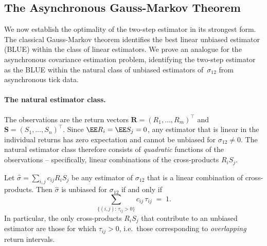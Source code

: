 %
%

\subsection{The Asynchronous Gauss-Markov Theorem}
\label{sec:gaussmarkov}

We now establish the optimality of the two-step estimator in its
strongest form.  The classical Gauss-Markov theorem identifies the
best linear unbiased estimator (BLUE) within the class of linear
estimators.  We prove an analogue for the asynchronous covariance
estimation problem, identifying the two-step estimator as the BLUE
within the natural class of unbiased estimators of~$\sigma_{12}$
from asynchronous tick data.

\paragraph{The natural estimator class.}
The observations are the return vectors
$\mathbf{R} = (R_1,\dots,R_m)^\top$ and
$\mathbf{S} = (S_1,\dots,S_n)^\top$.
Since $\EE R_i = \EE S_j = 0$, any estimator that is linear in the
individual returns has zero expectation and cannot be unbiased for
$\sigma_{12} \neq 0$.  The natural estimator class therefore
consists of \emph{quadratic} functions of the observations --
specifically, linear combinations of the cross-products $R_iS_j$.

\begin{lemma}
\label{lem:unbiased_class}
Let $\hat\sigma = \sum_{i,j} c_{ij} R_i S_j$ be any estimator of
$\sigma_{12}$ that is a linear combination of cross-products.
Then $\hat\sigma$ is unbiased for $\sigma_{12}$ if and only if
\begin{equation}\label{eq:unbiased_char}
    \sum_{\{(i,j):\,\tau_{ij}>0\}} c_{ij}\,\tau_{ij} \;=\; 1.
\end{equation}
In particular, the only cross-products $R_iS_j$ that contribute to
an unbiased estimator are those for which $\tau_{ij}>0$, i.e.\
those corresponding to \emph{overlapping} return intervals.
\end{lemma}


